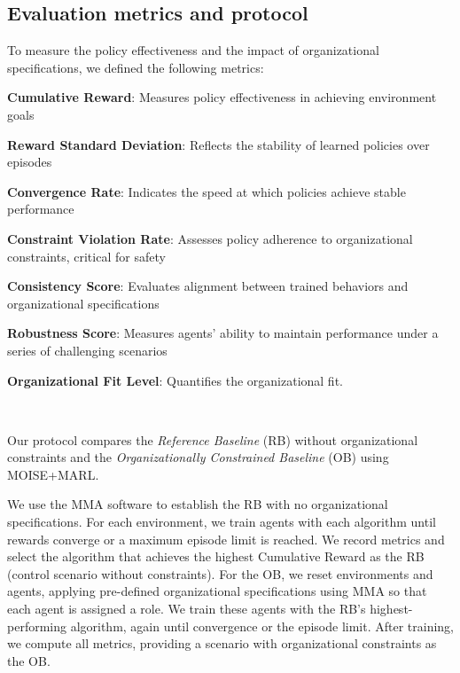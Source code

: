 \documentclass[sigconf]{aamas}
\begin{document}
\subsection{Evaluation metrics and protocol}

To measure the policy effectiveness and the impact of organizational specifications, we defined the following metrics:
%
\begin{enumerate*}[label={\roman*)}, itemjoin={; \quad}]
  \item \textbf{Cumulative Reward}: Measures policy effectiveness in achieving environment goals
  \item \textbf{Reward Standard Deviation}: Reflects the stability of learned policies over episodes
  \item \textbf{Convergence Rate}: Indicates the speed at which policies achieve stable performance
  \item \textbf{Constraint Violation Rate}: Assesses policy adherence to organizational constraints, critical for safety
  \item \textbf{Consistency Score}: Evaluates alignment between trained behaviors and organizational specifications
  \item \textbf{Robustness Score}: Measures agents' ability to maintain performance under a series of challenging scenarios
  \item \textbf{Organizational Fit Level}: Quantifies the organizational fit.
\end{enumerate*}

\

\noindent Our protocol compares the \textit{Reference Baseline} (RB) without organizational constraints and the \textit{Organizationally Constrained Baseline} (OB) using MOISE+MARL.

We use the MMA software to establish the RB with no organizational specifications. For each environment, we train agents with each algorithm until rewards converge or a maximum episode limit is reached. We record metrics and select the algorithm that achieves the highest Cumulative Reward as the RB (control scenario without constraints).
%
For the OB, we reset environments and agents, applying pre-defined organizational specifications using MMA so that each agent is assigned a role. We train these agents with the RB's highest-performing algorithm, again until convergence or the episode limit. After training, we compute all metrics, providing a scenario with organizational constraints as the OB.
\end{document}
